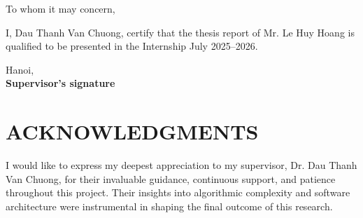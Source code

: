 \documentclass[12pt, a4paper]{article}
\begin{document}

\newpage
\thispagestyle{empty}

\vspace*{1.5cm}

\begin{center}
    To whom it may concern,
\end{center}

\vspace{0.8cm}

I, Dau Thanh Van Chuong, certify that the
thesis report of Mr. Le Huy Hoang is qualified to be presented in the Internship
July 2025--2026.

\vspace{3cm}

\begin{flushright}
    Hanoi, \underline{\hspace{2.5cm}}\\[0.8cm]
    \textbf{Supervisor's signature}
\end{flushright}

\newpage


\clearpage

\setcounter{page}{1}

\tableofcontents

\newpage


\section*{ACKNOWLEDGMENTS}

I would like to express my deepest appreciation to my supervisor, Dr. Dau Thanh Van Chuong, for their invaluable guidance, continuous support, and patience throughout
this project. Their insights into algorithmic complexity and software architecture
were instrumental in shaping the final outcome of this research.
\end{document}
